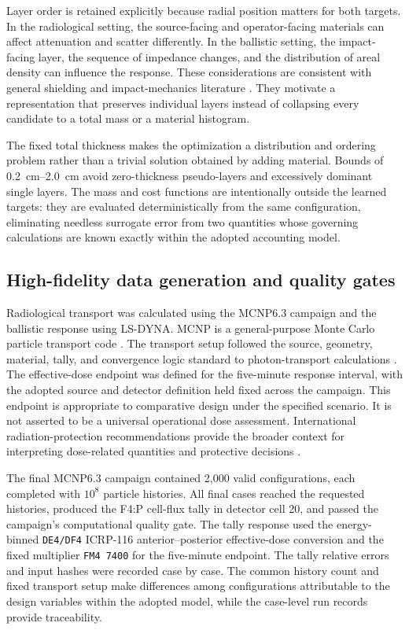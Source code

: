 \documentclass[12pt]{elsarticle}
\newcommand{\SI}[2]{#1~#2}
\begin{document}
	Layer order is retained explicitly because radial position matters for both targets. In the radiological setting, the source-facing and operator-facing materials can affect attenuation and scatter differently. In the ballistic setting, the impact-facing layer, the sequence of impedance changes, and the distribution of areal density can influence the response. These considerations are consistent with general shielding and impact-mechanics literature \cite{CarlucciJacobson2014,Chilton1984,Hazell2015,Zukas1990,Crouch2016}. They motivate a representation that preserves individual layers instead of collapsing every candidate to a total mass or a material histogram.
	
	The fixed total thickness makes the optimization a distribution and ordering problem rather than a trivial solution obtained by adding material. Bounds of \SI{0.2}{cm}--\SI{2.0}{cm} avoid zero-thickness pseudo-layers and excessively dominant single layers. The mass and cost functions are intentionally outside the learned targets: they are evaluated deterministically from the same configuration, eliminating needless surrogate error from two quantities whose governing calculations are known exactly within the adopted accounting model.
	
	\subsection{High-fidelity data generation and quality gates}
	
	Radiological transport was calculated using the MCNP6.3 campaign and the ballistic response using LS-DYNA. MCNP is a general-purpose Monte Carlo particle transport code \cite{Kulesza2022MCNP63,X5MCNP2003v1,X5MCNP2003v2}. The transport setup followed the source, geometry, material, tally, and convergence logic standard to photon-transport calculations \cite{ShultisFaw2011,Turner2007,NISTXCOM}. The effective-dose endpoint was defined for the five-minute response interval, with the adopted source and detector definition held fixed across the campaign. This endpoint is appropriate to comparative design under the specified scenario. It is not asserted to be a universal operational dose assessment. International radiation-protection recommendations provide the broader context for interpreting dose-related quantities and protective decisions \cite{ICRP2007Pub103,ICRP2009Pub109,NCRP2001Report138,IAEA2015GSR7}.
	
	The final MCNP6.3 campaign contained 2,000 valid configurations, each completed with $10^8$ particle histories. All final cases reached the requested histories, produced the F4:P cell-flux tally in detector cell 20, and passed the campaign's computational quality gate. The tally response used the energy-binned \texttt{DE4/DF4} ICRP-116 anterior--posterior effective-dose conversion and the fixed multiplier \texttt{FM4 7400} for the five-minute endpoint. The tally relative errors and input hashes were recorded case by case. The common history count and fixed transport setup make differences among configurations attributable to the design variables within the adopted model, while the case-level run records provide traceability.
	
\end{document}
